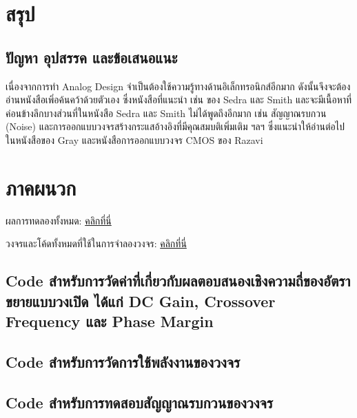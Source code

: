 \documentclass[a4paper, 11pt, oneside]{book} %
\begin{document}
\chapter{สรุป}

\section{ปัญหา อุปสรรค และข้อเสนอแนะ}

เนื่องจากการทำ Analog Design จำเป็นต้องใช้ความรู้ทางด้านอิเล็กทรอนิกส์อีกมาก ดังนั้นจึงจะต้องอ่านหนังสือเพิ่อค้นคว้าด้วยตัวเอง ซึ่งหนังสือที่แนะนำ เช่น ของ Sedra และ Smith \cite{Sedra15} และจะมีเนื้อหาที่ค่อนข้างลึกบางส่วนที่ในหนังสือ Sedra และ Smith ไม่ได้พูดถึงอีกมาก เช่น สัญญาณรบกวน (Noise) และการออกแบบวงจรสร้างกระแสอ้างอิงที่มีคุณสมบติเพิ่มเติม ฯลฯ ซึ่งแนะนำให้อ่านต่อไปในหนังสือของ Gray \cite{Grey09} และหนังสือการออกแบบวงจร CMOS ของ Razavi \cite{Razavi17}

\backmatter

\chapter*{ภาคผนวก}

ผลการทดลองทั้งหมด: \href{https://mega.nz/folder/Sywj2IDA#qnUAwmZCUlo6esYIEv0eHQ}{คลิกที่นี่}

วงจรและโค้ดทั้งหมดที่ใช้ในการจำลองวงจร: \href{https://github.com/nutchanonj/LTSpice_with_Python}{คลิกที่นี่}

\section*{Code สำหรับการวัดค่าที่เกี่ยวกับผลตอบสนองเชิงความถี่ของอัตราขยายแบบวงเปิด ได้แก่ DC Gain, Crossover Frequency และ Phase Margin}

\begin{singlespace}

\end{singlespace}

\section*{Code สำหรับการวัดการใช้พลังงานของวงจร}

\begin{singlespace}

\end{singlespace}

\section*{Code สำหรับการทดสอบสัญญาณรบกวนของวงจร}
\end{document}
